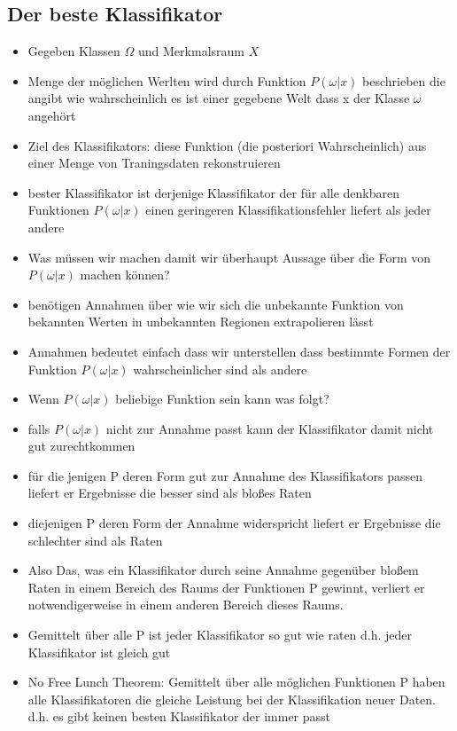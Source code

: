 \documentclass{article} %
\begin{document}
	\subsection{Der beste Klassifikator}
	\begin{itemize}
		\item Gegeben Klassen $\Omega$ und Merkmalsraum $X$
		\item Menge der möglichen Werlten wird durch Funktion $P(\omega|x)$ beschrieben die angibt wie wahrscheinlich es ist einer gegebene Welt dass x der Klasse $\omega$ angehört
		\item Ziel des Klassifikators: diese Funktion (die posteriori Wahrscheinlich) aus einer Menge von Traningsdaten rekonstruieren
		\item bester Klassifikator ist derjenige Klassifikator der für alle denkbaren Funktionen $P(\omega|x)$ einen geringeren Klassifikationsfehler liefert als jeder andere
		\item Was müssen wir machen damit wir überhaupt Aussage über die Form von $P(\omega|x)$ machen können?
		\item benötigen Annahmen über wie wir sich die unbekannte Funktion von bekannten Werten in unbekannten Regionen extrapolieren lässt
		\item Annahmen bedeutet einfach dass wir unterstellen dass bestimmte Formen der Funktion $P(\omega|x)$ wahrscheinlicher sind als andere
		\item Wenn $P(\omega|x)$ beliebige Funktion sein kann was folgt?
		\item falls $P(\omega|x)$ nicht zur Annahme passt kann der Klassifikator damit nicht gut zurechtkommen
		\item für die jenigen P deren Form gut zur Annahme des Klassifikators passen liefert er Ergebnisse die besser sind als bloßes Raten
		\item diejenigen P deren Form der Annahme widerspricht liefert er Ergebnisse die schlechter sind als Raten
		\item Also Das, was ein Klassifikator durch seine Annahme gegenüber bloßem Raten in einem Bereich des Raums der Funktionen P gewinnt, verliert er notwendigerweise in einem anderen Bereich dieses Raums.
		\item Gemittelt über alle P ist jeder Klassifikator so gut wie raten d.h. jeder Klassifikator ist gleich gut
		\item No Free Lunch Theorem: \glqq Gemittelt über alle möglichen Funktionen P haben alle Klassifikatoren die
		gleiche Leistung bei der Klassifikation neuer Daten. \grqq d.h. es gibt keinen besten Klassifikator der immer passt
	\end{itemize}
\end{document}
